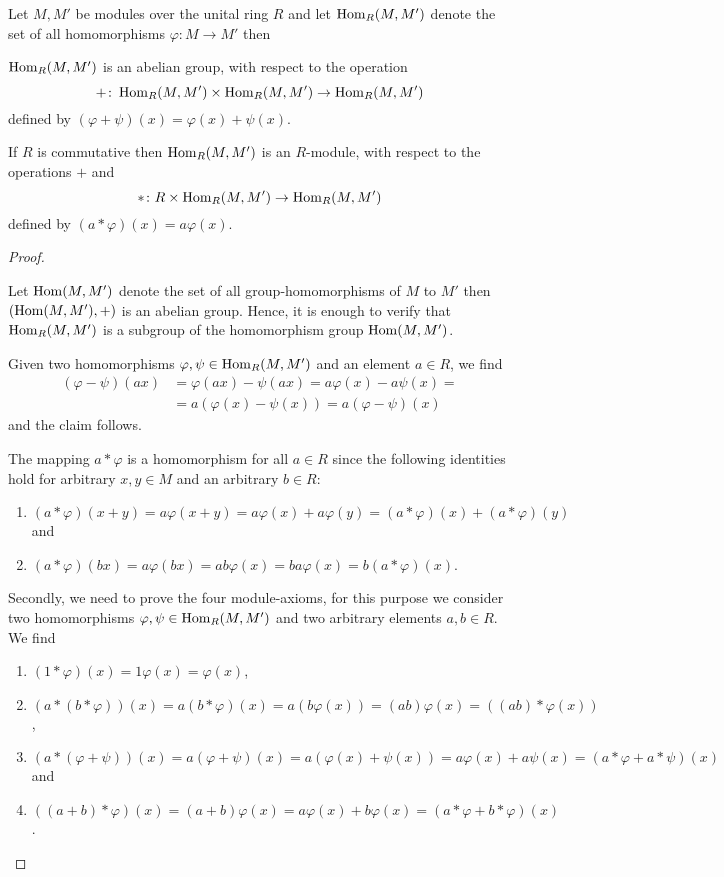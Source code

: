 \begin{pro}\label{prop.Homomorphisms are Module}
Let $M,M'$ be modules over the unital ring $R$ and let $\operatorname{\mathrm{Hom}}_R(M,M')$ denote the set of all homomorphisms $\varphi\colon M\to M'$ then
\begin{thmlist}
\item \label{prop.Homomorphisms are Group} $\operatorname{\mathrm{Hom}}_R(M,M')$ is an abelian group, with respect to the operation \[+\colon\operatorname{\mathrm{Hom}}_R(M,M')\times\operatorname{\mathrm{Hom}}_R(M,M')\to\operatorname{\mathrm{Hom}}_R(M,M')\]
defined by $(\varphi+\psi)(x)=\varphi(x)+\psi(x)$.
\item If $R$ is commutative then $\operatorname{\mathrm{Hom}}_R(M,M')$ is an $R$-module, with respect to the operations $+$ and 
\[\ast\colon R\times\operatorname{\mathrm{Hom}}_R(M,M')\to\operatorname{\mathrm{Hom}}_R(M,M')\]
defined by $(a\ast\varphi)(x)=a\varphi(x)$.
\end{thmlist}
\end{pro}
\begin{proof}
\begin{plist}
\item \sloppypar Let $\operatorname{\mathrm{Hom}}(M,M')$ denote the set of all group-ho\-mo\-morph\-isms of $M$ to $M'$ then $(\operatorname{\mathrm{Hom}}(M,M'),+)$ is an abelian group. Hence, it is enough to verify that $\operatorname{\mathrm{Hom}}_R(M,M')$ is a subgroup of the homomorphism group $\operatorname{\mathrm{Hom}}(M,M')$.

Given two homomorphisms $\varphi,\psi\in\operatorname{\mathrm{Hom}}_R(M,M')$ and an element $a\in R$, we find
\begin{align*}
(\varphi-\psi)(ax)&=\varphi(ax)-\psi(ax)=a\varphi(x)-a\psi(x)=\\
            &=a(\varphi(x)-\psi(x))=a(\varphi-\psi)(x)
\end{align*}
and the claim follows.
\item The mapping $a\ast\varphi$ is a homomorphism for all $a\in R$ since the following identities hold for arbitrary $x,y\in M$ and an arbitrary $b\in R$:
\begin{enumerate}
\item $(a\ast\varphi)(x+y)=a\varphi(x+y)=a\varphi(x)+a\varphi(y)=(a\ast\varphi)(x)+(a\ast\varphi)(y)$ and
\item $(a\ast\varphi)(bx)=a\varphi(bx)=ab\varphi(x)=ba\varphi(x)=b(a\ast\varphi)(x)$.
\end{enumerate} 


Secondly, we need to prove the four module-axioms, for this purpose we consider two homomorphisms $\varphi,\psi\in\operatorname{\mathrm{Hom}}_R(M,M')$ and two arbitrary elements $a,b\in R$. We find
\begin{enumerate}
\item $(1\ast\varphi)(x)=1\varphi(x)=\varphi(x)$,
\item $(a\ast(b\ast\varphi))(x)=a(b\ast\varphi)(x)=a(b\varphi(x))=(ab)\varphi(x)=((ab)\ast\varphi(x))$,
\item $(a\ast(\varphi+\psi))(x)=a(\varphi+\psi)(x)=a(\varphi(x)+\psi(x))=a\varphi(x)+a\psi(x)=(a\ast\varphi + a\ast\psi)(x)$ and
\item $((a+b)\ast\varphi)(x)=(a+b)\varphi(x)=a\varphi(x)+b\varphi(x)=(a\ast\varphi+b\ast\varphi)(x)$.
\end{enumerate}
\end{plist}
\end{proof}

